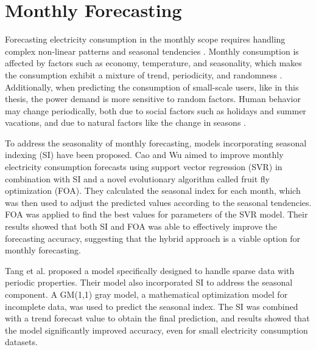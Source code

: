 

\section{Monthly Forecasting}


Forecasting electricity consumption in the monthly scope requires handling complex non-linear patterns and seasonal tendencies \cite{cao_support_2016}. Monthly consumption is affected by factors such as economy, temperature, and seasonality, which makes the consumption exhibit a mixture of trend, periodicity, and randomness \cite{tang_gm11_2022}. Additionally, when predicting the consumption of small-scale users, like in this thesis, the power demand is more sensitive to random factors. Human behavior may change periodically, both due to social factors such as holidays and summer vacations, and due to natural factors like the change in seasons \cite{sun_monthly_2019}.

To address the seasonality of monthly forecasting, models incorporating seasonal indexing (SI) have been proposed. Cao and Wu \cite{cao_support_2016} aimed to improve monthly electricity consumption forecasts using support vector regression (SVR) in combination with SI and a novel evolutionary algorithm called fruit fly optimization (FOA). They calculated the seasonal index for each month, which was then used to adjust the predicted values according to the seasonal tendencies. FOA was applied to find the best values for parameters of the SVR model. Their results showed that both SI and FOA was able to effectively improve the forecasting accuracy, suggesting that the hybrid approach is a viable option for monthly forecasting.

Tang et al. \cite{tang_gm11_2022} proposed a model specifically designed to handle sparse data with periodic properties. Their model also incorporated SI to address the seasonal component. A GM(1,1) gray model, a mathematical optimization model for incomplete data, was used to predict the seasonal index. The SI was combined with a trend forecast value to obtain the final prediction, and results showed that the model significantly improved accuracy, even for small electricity consumption datasets.

